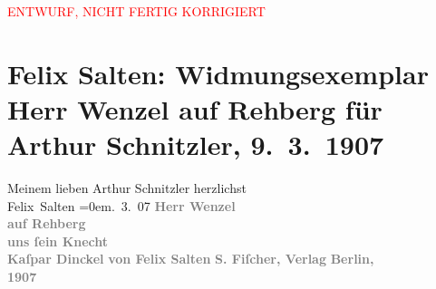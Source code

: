 
\begin{center}
            \textcolor{red}{ENTWURF, NICHT FERTIG KORRIGIERT}
                      \end{center}
            
         \renewcommand{\erwaehnteInstitutionen}{Institutionen: S. Fischer Verlag}
         \renewcommand{\erwaehnteOrte}{Orte: Berlin}
         \renewcommand{\erwaehnteWerke}{Werke: Herr Wenzel auf Rehberg und sein Knecht Kaspar Dinckel}
               \section[Felix Salten: Widmungsexemplar Herr Wenzel auf Rehberg für Arthur Schnitzler, 9. 3. 1907]{ Felix Salten: Widmungsexemplar Herr Wenzel auf Rehberg für Arthur
               Schnitzler, 9. 3. 1907}\nopagebreak{}\rehead{ }\begin{ledgroupsized}[t]{13cm}\normalsize\beginnumbering \toendnotes[C]{\smallbreak\pagebreak[2]} 
\pstart
           \noindent{}{\pb}Meinem lieben Arthur Schnitzler\pend
           \pstart
           herzlichst{\\[\baselineskip]}\spacefill\mbox{Felix Salten}\pend
           \leftskip=0em{}. 3. 07\pend
           {\bigskip}\pstart
           \noindent{}\centering{}\textcolor{gray}{\textbf{Herr Wenzel{\\}auf Rehberg{\\}uns ſein
                     Knecht{\\}Kaſpar Dinckel}}\pend
           \pstart
           \noindent{}\centering{}\textcolor{gray}{\textbf{von Felix Salten}}\pend
           {\bigskip}\pstart
           \noindent{}\centering{}\textcolor{gray}{\textbf{S. Fiſcher, Verlag}}\pend
           \pstart
           \noindent{}\centering{}\textcolor{gray}{\textbf{Berlin,}}{\\}\textcolor{gray}{\textbf{1907}}\pend
           
         
         \endnumbering{}\end{ledgroupsized}\begin{anhang}\end{anhang}\newcommand{\dateiname}{L03046}\newcommand{\titel}{Felix Salten: Widmungsexemplar Herr Wenzel auf Rehberg für Arthur Schnitzler, 9. 3. 1907}\newcommand{\editorInnen}{Martin Anton Müller und Laura Untner}
      